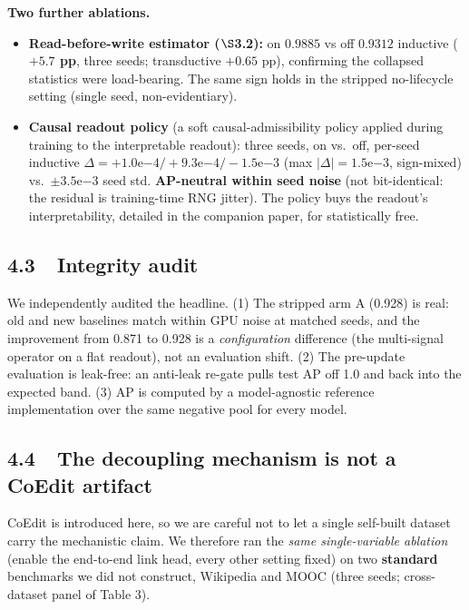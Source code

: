\documentclass[conference]{IEEEtran}
\begin{document}
\textbf{Two further ablations.}
\begin{itemize}
\item \textbf{Read-before-write estimator ($\S$3.2):} on $0.9885$ vs off $0.9312$ inductive (\textbf{$+5.7$ pp}, three seeds; transductive $+0.65$ pp), confirming the collapsed statistics were load-bearing. The same sign holds in the stripped no-lifecycle setting (single seed, non-evidentiary).
\item \textbf{Causal readout policy} (a soft causal-admissibility policy applied during training to the interpretable readout): three seeds, on vs.\ off, per-seed inductive $\Delta = +1.0\mathrm{e}{-4} / +9.3\mathrm{e}{-4} / -1.5\mathrm{e}{-3}$ (max $|\Delta|=1.5\mathrm{e}{-3}$, sign-mixed) vs.\ $\pm 3.5\mathrm{e}{-3}$ seed std. \textbf{AP-neutral within seed noise} (not bit-identical: the residual is training-time RNG jitter). The policy buys the readout's interpretability, detailed in the companion paper, for statistically free.
\end{itemize}

\subsection*{4.3~~Integrity audit}

We independently audited the headline. (1) The stripped arm A (0.928) is real: old and new baselines match within GPU noise at matched seeds, and the improvement from 0.871 to 0.928 is a \emph{configuration} difference (the multi-signal operator on a flat readout), not an evaluation shift. (2) The pre-update evaluation is leak-free: an anti-leak re-gate pulls test AP off 1.0 and back into the expected band. (3) AP is computed by a model-agnostic reference implementation over the same negative pool for every model.

\subsection*{4.4~~The decoupling mechanism is not a CoEdit artifact}

CoEdit is introduced here, so we are careful not to let a single self-built dataset carry the mechanistic claim. We therefore ran the \emph{same single-variable ablation} (enable the end-to-end link head, every other setting fixed) on two \textbf{standard} benchmarks we did not construct, Wikipedia and MOOC (three seeds; cross-dataset panel of Table 3).
\end{document}
